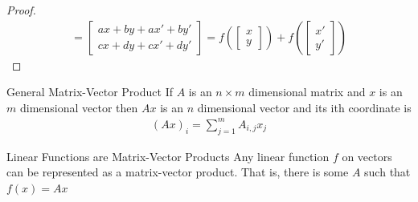 \documentclass[11pt]{article}
\begin{document}
\begin{proof}
\begin{align*}
        =
        \begin{bmatrix}
            ax + by + ax' + by' \\
            cx + dy + cx' + dy'
        \end{bmatrix}
        =
        f\left(
            \begin{bmatrix}
                x \\
                y
            \end{bmatrix}
        \right)
        +
        f\left(
            \begin{bmatrix}
                x' \\
                y'
            \end{bmatrix}
        \right)
    \end{align*}
\end{proof}

\begin{definitionbox}{General Matrix-Vector Product}
    If $A$ is an $n \times m$ dimensional matrix and $x$ is an $m$ dimensional vector then $Ax$ is an $n$ dimensional vector and its ith coordinate is
    \begin{align*}
        (Ax)_i = \sum_{j=1}^{m} A_{i,j} x_j
    \end{align*}
\end{definitionbox}

\begin{theorembox}{Linear Functions are Matrix-Vector Products}
    Any linear function $f$ on vectors can be represented as a matrix-vector product. That is, there is some $A$ such that $f(x) = Ax$
\end{theorembox}
\end{document}
